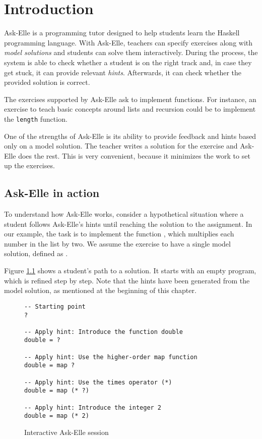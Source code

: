 \chapter{Introduction}
\label{sec:intro}

Ask-Elle \cite{2017askelle} is a programming tutor designed to help students learn the Haskell programming language. With Ask-Elle, teachers can specify exercises along with \emph{model solutions} and students can solve them interactively. During the process, the system is able to check whether a student is on the right track and, in case they get stuck, it can provide relevant \emph{hints}. Afterwards, it can check whether the provided solution is correct.

The exercises supported by Ask-Elle ask to implement functions. For instance, an exercise to teach basic concepts around lists and recursion could be to implement the \texttt{length} function.

One of the strengths of Ask-Elle is its ability to provide feedback and hints based only on a model solution. The teacher writes a solution for the exercise and Ask-Elle does the rest. This is very convenient, because it minimizes the work to set up the exercises.

\section{Ask-Elle in action}
\label{sec:intro-askelle-example-session}

To understand how Ask-Elle works, consider a hypothetical situation where a student follows Ask-Elle's hints until reaching the solution to the assignment. In our example, the task is to implement the function , which multiplies each number in the list by two. We assume the exercise to have a single model solution, defined as .

Figure \ref{fig:interactive-session-double} shows a student's path to a solution. It starts with an empty program, which is refined step by step. Note that the hints have been generated from the model solution, as mentioned at the beginning of this chapter.

\begin{figure}
\begin{verbatim}
-- Starting point
?

-- Apply hint: Introduce the function double
double = ?

-- Apply hint: Use the higher-order map function
double = map ?

-- Apply hint: Use the times operator (*)
double = map (* ?)

-- Apply hint: Introduce the integer 2
double = map (* 2)
\end{verbatim}
\caption{Interactive Ask-Elle session}
\label{fig:interactive-session-double}
\end{figure}

